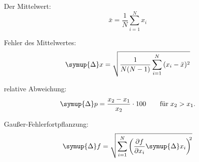 
Der Mittelwert:
\begin{equation}
  \bar{x} = \frac{1}{N} \sum_{i=1}^N{x_i}
  \label{eqn:Mittelwert}
\end{equation}

Fehler des Mittelwertes:
\begin{equation}
  \symup{\Delta}x = \sqrt{\frac{1}{N(N-1)}\sum_{i=1}^N{(x_i - \bar{x})^2}}
  \label{eqn:Standardabweichung}
\end{equation}

relative Abweichung:
\begin{equation}
  \symup{\Delta}p= \frac{x_2-x_1}{x_2} \cdot 100 \qquad \text{für} \; x_2 > x_1.
  \label{eqn:prozentabweichung}
\end{equation}

Gaußer-Fehlerfortpflanzung:
\begin{equation}
  \symup{\Delta}f= \sqrt{
    \sum\limits_{i = 1}^N
      \left( \frac{\partial f}{\partial x_i} \symup{\Delta}x_i \right)^{\!\! 2}
  }
  \label{eqn:gaussfehler}
\end{equation}
